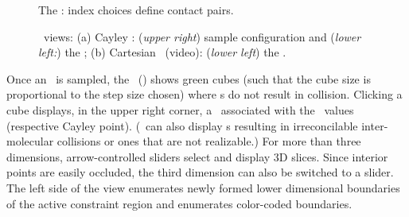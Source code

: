 


\def\wid{.3\linewidth}
\begin{figure}
\centering
{}
\label{fig:dumbelldialog}
\caption{The \ndialog: index choices define contact pairs.}
\end{figure}



\def\wid{.3\linewidth}
\begin{figure}
\centering
{}
\caption[\EASAL\ views]{
\EASAL\ views: (a) Cayley \pview: (\textit{upper right}) sample
configuration and (\textit{lower left:}) the \cgraph; (b) Cartesian
\rview\ (video): (\textit{lower left}) the \cgraph.
}
\label{fig:views}
\end{figure}



Once an \cgraph\ is sampled, the \pview\ ()
shows green cubes (such that the cube size is proportional to the
step size chosen) where \param s do not result in collision.
Clicking a cube displays, in the upper right corner, a \Cr\ associated
with the \param\ values (respective Cayley point). (\EASAL\ can also
display \param s resulting in irreconcilable inter-molecular
collisions or ones that are not realizable.) For more than three
dimensions, arrow-controlled sliders select and display 3D slices. 
Since interior points are easily occluded, the third dimension can 
also be switched to a slider. The left side of the view enumerates 
newly formed lower dimensional boundaries of the active constraint 
region and enumerates color-coded boundaries.

